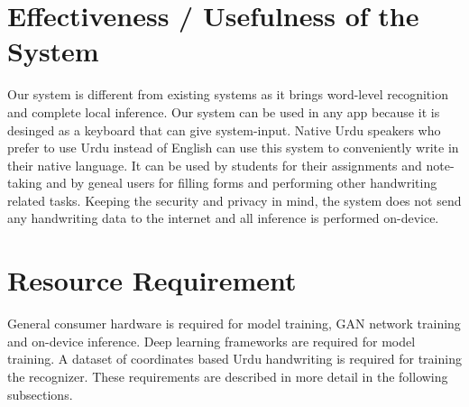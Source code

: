 \documentclass[12pt,a4paper]{report}
\begin{document}
\section{Effectiveness / Usefulness of the System}
Our system is different from existing systems as it brings word-level recognition and complete local inference. Our system can be used in any app because it is desinged as a keyboard that can give system-input. Native Urdu speakers who prefer to use Urdu instead of English can use this system to conveniently write in their native language. It can be used by students for their assignments and note-taking and by geneal users for filling forms and performing other handwriting related tasks. Keeping the security and privacy in mind, the system does not send any handwriting data to the internet and all inference is performed on-device.

\section{Resource Requirement}
General consumer hardware is required for model training, GAN network training and on-device inference. Deep learning frameworks are required for model training. A dataset of coordinates based Urdu handwriting is required for training the recognizer. These requirements are described in more detail in the following subsections.
\end{document}
